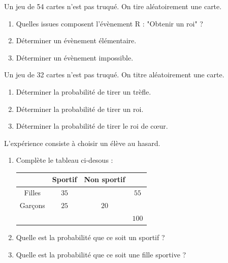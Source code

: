 \begin{pageAD} 


 
 
Un jeu de 54 cartes n'est pas truqué. On tire aléatoirement une carte.
\begin{enumerate}
\item Quelles issues composent l'évènement R : "Obtenir un roi" ?
\item Déterminer un évènement élémentaire. 
\item Déterminer un évènement impossible.
\end{enumerate}




 
 
Un jeu de 32 cartes n'est pas truqué. On titre aléatoirement une carte.
\begin{enumerate}
\item Déterminer la probabilité de tirer un trèfle.
\item Déterminer la probabilité de tirer un roi.
\item Déterminer la probabilité de tirer le roi de cœur.
\end{enumerate}
 

 
 


L'expérience consiste à choisir un élève au hasard. 

\begin{enumerate}
\item Complète le tableau ci-desous :

\begin{tabular}{|c|c|c|c|}
\hline 
 & Sportif & Non sportif &  \\ 
\hline 
Filles & $35$ &   & $55$ \\ 
\hline 
Garçons & $25$ & $20$ &  \\ 
\hline 
 &  &  & $100$ \\ 
\hline 
\end{tabular} 


\item Quelle est la probabilité que ce soit un sportif ? 
\item Quelle est la probabilité que ce soit une fille sportive ?

\end{enumerate}


\end{pageAD}
